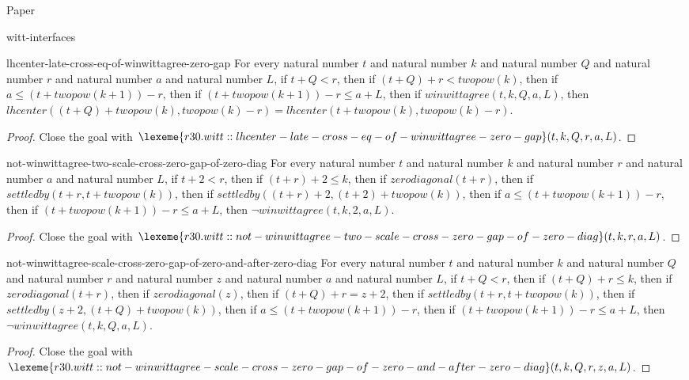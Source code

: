 \begin{lexlean}{Paper}
\begin{section}{witt-interfaces}
  \begin{theorem}{lhcenter-late-cross-eq-of-winwittagree-zero-gap}
  For every natural number \(t\) and natural number \(k\) and natural number \(Q\) and natural number \(r\) and natural number \(a\) and natural number \(L\), if \(t + Q < r\), then if \((t + Q) + r < twopow(k)\), then if \(a ≤ (t + twopow(k + 1)) - r\), then if \((t + twopow(k + 1)) - r ≤ a + L\), then if \(winwittagree(t, k, Q, a, L)\), then \(lhcenter((t + Q) + twopow(k), twopow(k) - r) = lhcenter(t + twopow(k), twopow(k) - r)\).
  \begin{proof}
  Close the goal with \(\lexeme{r30.witt::lhcenter-late-cross-eq-of-winwittagree-zero-gap}(t, k, Q, r, a, L)\).
  \end{proof}
  \end{theorem}

  \begin{theorem}{not-winwittagree-two-scale-cross-zero-gap-of-zero-diag}
  For every natural number \(t\) and natural number \(k\) and natural number \(r\) and natural number \(a\) and natural number \(L\), if \(t + 2 < r\), then if \((t + r) + 2 ≤ k\), then if \(zerodiagonal(t + r)\), then if \(settledby(t + r, t + twopow(k))\), then if \(settledby((t + r) + 2, (t + 2) + twopow(k))\), then if \(a ≤ (t + twopow(k + 1)) - r\), then if \((t + twopow(k + 1)) - r ≤ a + L\), then \(¬ winwittagree(t, k, 2, a, L)\).
  \begin{proof}
  Close the goal with \(\lexeme{r30.witt::not-winwittagree-two-scale-cross-zero-gap-of-zero-diag}(t, k, r, a, L)\).
  \end{proof}
  \end{theorem}

  \begin{theorem}{not-winwittagree-scale-cross-zero-gap-of-zero-and-after-zero-diag}
  For every natural number \(t\) and natural number \(k\) and natural number \(Q\) and natural number \(r\) and natural number \(z\) and natural number \(a\) and natural number \(L\), if \(t + Q < r\), then if \((t + Q) + r ≤ k\), then if \(zerodiagonal(t + r)\), then if \(zerodiagonal(z)\), then if \((t + Q) + r = z + 2\), then if \(settledby(t + r, t + twopow(k))\), then if \(settledby(z + 2, (t + Q) + twopow(k))\), then if \(a ≤ (t + twopow(k + 1)) - r\), then if \((t + twopow(k + 1)) - r ≤ a + L\), then \(¬ winwittagree(t, k, Q, a, L)\).
  \begin{proof}
  Close the goal with \(\lexeme{r30.witt::not-winwittagree-scale-cross-zero-gap-of-zero-and-after-zero-diag}(t, k, Q, r, z, a, L)\).
  \end{proof}
  \end{theorem}


\end{section}
\end{lexlean}
